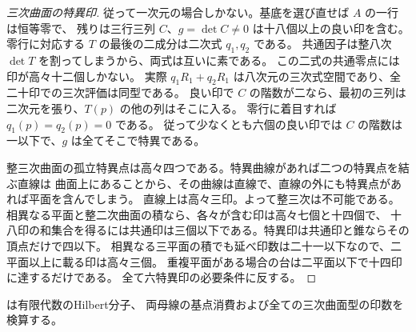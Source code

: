 \begin{proof}[三次曲面の特異印]
従って一次元の場合しかない。基底を選び直せば $A$ の一行は恒等零で、
残りは三行三列 $C$、$g=\det C\ne0$ は十八個以上の良い印を含む。
零行に対応する $T$ の最後の二成分は二次式 $q_1,q_2$ である。
共通因子は整八次 $\det T$ を割ってしまうから、両式は互いに素である。
この二式の共通零点には印が高々十二個しかない。
実際 $q_1 R_1+q_2 R_1$ は八次元の三次式空間であり、全二十印での三次評価は同型である。
良い印で $C$ の階数が二なら、最初の三列は二次元を張り、$T(p)$ の他の列はそこに入る。
零行に着目すれば $q_1(p)=q_2(p)=0$ である。
従って少なくとも六個の良い印では $C$ の階数は一以下で、$g$ は全てそこで特異である。

整三次曲面の孤立特異点は高々四つである。特異曲線があれば二つの特異点を結ぶ直線は
曲面上にあることから、その曲線は直線で、直線の外にも特異点があれば平面を含んでしまう。
直線上は高々三印。よって整三次は不可能である。
相異なる平面と整二次曲面の積なら、各々が含む印は高々七個と十四個で、
十八印の和集合を得るには共通印は三個以下である。特異印は共通印と錐ならその頂点だけで四以下。
相異なる三平面の積でも延べ印数は二十一以下なので、二平面以上に載る印は高々三個。
重複平面がある場合の台は二平面以下で十四印に達するだけである。
全て六特異印の必要条件に反する。
\end{proof}
 は有限代数のHilbert分子、
両母線の基点消費および全ての三次曲面型の印数を検算する。
